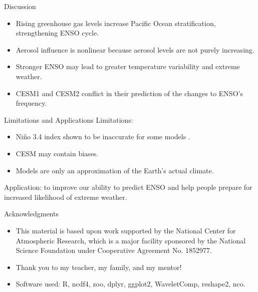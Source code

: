 \documentclass{beamer}
\begin{document}

\begin{frame}{Discussion}
  \begin{itemize}
  \item Rising greenhouse gas levels increase Pacific Ocean stratification, strengthening ENSO cycle.
  \item Aerosol influence is nonlinear because aerosol levels are not purely increasing.
  \item Stronger ENSO may lead to greater temperature variability and extreme weather.
  \item CESM1 and CESM2 conflict in their prediction of the changes to ENSO's frequency.
  \end{itemize}
\end{frame}

\begin{frame}{Limitations and Applications}
  Limitations:
  \begin{itemize}
  \item Niño 3.4 index shown to be inaccurate for some models \citep{cai2018increased}.
  \item CESM may contain biases.
  \item Models are only an approximation of the Earth's actual climate.
  \end{itemize}
  Application: to improve our ability to predict ENSO and help people prepare for increased likelihood of extreme weather.
\end{frame}

\begin{frame}{Acknowledgments}
  \begin{itemize}
  \item This material is based upon work supported by the National Center for Atmospheric Research, which is a major facility sponsored by the National Science Foundation under Cooperative Agreement No. 1852977.
  \item Thank you to my teacher, my family, and my mentor!
  \item Software used: R, ncdf4, zoo, dplyr, ggplot2, WaveletComp, reshape2, nco.
  \end{itemize}
\end{frame}
\end{document}
